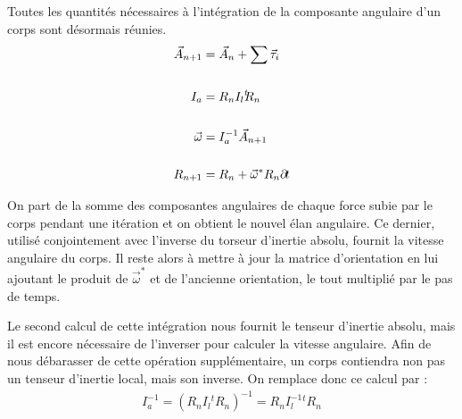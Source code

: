 Toutes les quantités nécessaires à l'intégration de la composante
angulaire d'un corps sont désormais réunies.
\begin{align*}
  \vec{A}_{n+1} &= \vec{A}_n + \sum \vec{\tau}_i \\ \\
  I_a &= R_n I_l {}^t\!\!R_n \\ \\
  \vec{\omega} &= I^{-1}_a \vec{A}_{n+1} \\ \\
  R_{n+1} &= R_n + \vec{\omega}^* R_n \partial \! t
\end{align*}

On part de la somme des composantes angulaires de chaque force subie
par le corps pendant une itération et on obtient le nouvel élan
angulaire. Ce dernier, utilisé conjointement avec l'inverse du torseur
d'inertie absolu, fournit la vitesse angulaire du corps. Il reste
alors à mettre à jour la matrice d'orientation en lui ajoutant le
produit de $\vec{\omega}^*$ et de l'ancienne orientation, le tout
multiplié par le pas de temps.

Le second calcul de cette intégration nous fournit le tenseur
d'inertie absolu, mais il est encore nécessaire de l'inverser pour
calculer la vitesse angulaire. Afin de nous débarasser de cette
opération supplémentaire, un corps contiendra non pas un tenseur
d'inertie local, mais son inverse. On remplace donc ce calcul par :
\begin{align*}
  I^{-1}_a = (R_n I_l {}^t\!\!R_n)^{-1} = R_n I^{-1}_l {}^t\!\!R_n
\end{align*}
